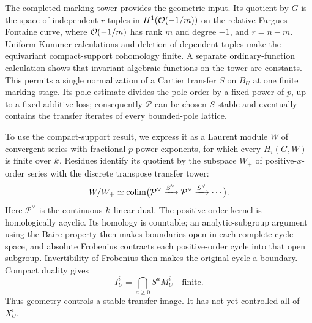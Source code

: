 The completed marking tower provides the geometric input.
Its quotient by $G$ is the space of independent $r$-tuples in
$H^1(\mathcal O(-1/m))$ on the relative Fargues--Fontaine curve, where
$\mathcal O(-1/m)$ has rank $m$ and degree $-1$, and $r=n-m$. Uniform Kummer calculations and deletion of dependent
tuples make the equivariant compact-support cohomology finite.
A separate ordinary-function calculation shows that invariant
algebraic functions on the tower are constants. This permits a
single normalization of a Cartier transfer $S$ on $B_U$ at one
finite marking stage. Its pole estimate divides the pole order
by a fixed power of $p$, up to a fixed additive loss; consequently
$\mathcal P$ can be chosen $S$-stable and eventually contains the
transfer iterates of every bounded-pole lattice.

To use the compact-support result, we express it as a Laurent
module $W$ of convergent series with fractional $p$-power
exponents, for which every $H_i(G,W)$ is finite over $k$.
Residues identify
its quotient by the subspace $W_+$ of positive-$x$-order series
with the discrete transpose transfer tower:
\[
 W/W_+\simeq
 \operatorname*{colim}\bigl(\mathcal P^\vee\xrightarrow{S^\vee}
                   \mathcal P^\vee\xrightarrow{S^\vee}\cdots\bigr).
\]
Here $\mathcal P^\vee$ is the continuous $k$-linear dual.
The positive-order kernel is homologically acyclic. Its homology
is countable; an analytic-subgroup argument using the Baire
property then makes boundaries open in each complete cycle space, and
absolute Frobenius contracts each positive-order cycle into that
open subgroup. Invertibility of Frobenius then makes the original
cycle a boundary. Compact duality gives
\[
 I^i_U=\bigcap_{a\geq0}S^aM^i_U\quad\text{finite}.
\]
Thus geometry controls a stable transfer image. It has not yet
controlled all of $X^i_U$.

